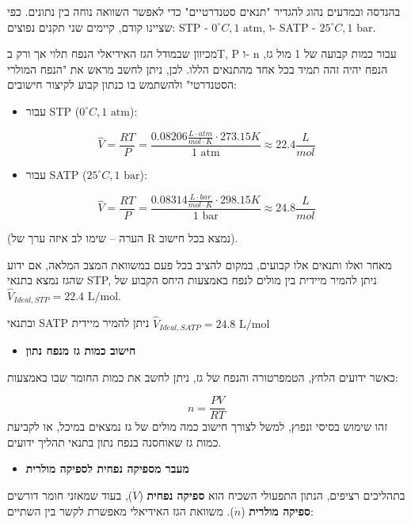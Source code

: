 \documentclass[
  hebrew,
  letterpaper,
  DIV=11,
  numbers=noendperiod]{scrreprt}
\providecommand{\tightlist}{%
  \setlength{\itemsep}{0pt}\setlength{\parskip}{0pt}}
\begin{document}
בהנדסה ובמדעים נהוג להגדיר "תנאים סטנדרטיים" כדי לאפשר השוואה נוחה בין
נתונים. כפי שציינו קודם, קיימים שני תקנים נפוצים: STP -
\(0^{\circ}C,1\text{ atm}\), ו- SATP - \(25^{\circ}C,1\text{ bar}\).

מכיוון שבמודל הגז האידיאלי הנפח תלוי אך ורק בT, P ו- n עבור כמות קבועה
של 1 מול גז, הנפח יהיה זהה תמיד בכל אחד מהתנאים הללו. לכן, ניתן לחשב
מראש את "הנפח המולרי הסטנדרטי" ולהשתמש בו כנתון קבוע לקיצור חישובים:

\begin{itemize}
\tightlist
\item
  עבור STP (\(0^{\circ}C,1\text{ atm}\)):
\end{itemize}

\[\widehat{V} = \frac{RT}{P} = \frac{0.08206\frac{L \cdot atm}{mol \cdot K} \cdot 273.15K}{1\text{ atm}} \approx 22.4\frac{L}{mol}\]

\begin{itemize}
\tightlist
\item
  עבור SATP (\(25^{\circ}C,1\text{ bar}\)):
\end{itemize}

\[\widehat{V} = \frac{RT}{P} = \frac{0.08314\frac{L \cdot bar}{mol \cdot K} \cdot 298.15K}{1\text{ bar}} \approx 24.8\frac{L}{mol}\]

(הערה -- שימו לב איזה ערך של R נמצא בכל חישוב).

מאחר ואלו ותנאים אלו קבועים, במקום להציב בכל פעם במשוואת המצב המלאה, אם
ידוע שהגז נמצא בתנאי STP, ניתן להמיר מיידית בין מולים לנפח באמצעות היחס
הקבוע של \({\widehat{V}}_{Ideal,STP} = 22.4\text{ L/mol}\).

ובתנאי SATP ניתן להמיר מיידית
\({\widehat{V}}_{Ideal,SATP} = 24.8\text{ L/mol}\)

\begin{itemize}
\tightlist
\item
  \textbf{חישוב כמות גז מנפח נתון}
\end{itemize}

כאשר ידועים הלחץ, הטמפרטורה והנפח של גז, ניתן לחשב את כמות החומר שבו
באמצעות:

\[n = \frac{PV}{RT}\] זהו שימוש בסיסי ונפוץ, למשל לצורך חישוב כמה מולים
של גז נמצאים במיכל, או לקביעת כמות גז שאוחסנה בנפח נתון בתנאי תהליך
ידועים.

\begin{itemize}
\tightlist
\item
  \textbf{מעבר מספיקה נפחית לספיקה מולרית}
\end{itemize}

בתהליכים רציפים, הנתון התפעולי השכיח הוא \textbf{ספיקה נפחית}
(\(\dot{V}\)), בעוד שמאזני חומר דורשים \textbf{ספיקה מולרית}
(\(\dot{n}\)). משוואת הגז האידיאלי מאפשרת לקשר בין השתיים:
\end{document}
